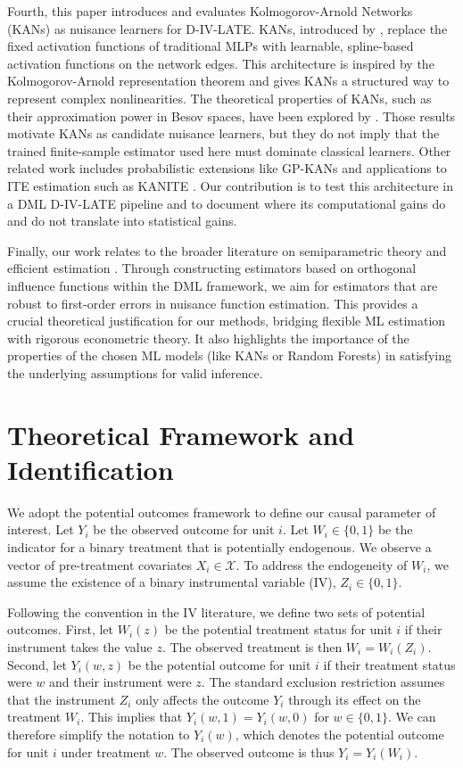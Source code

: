 \documentclass[final,3p,fleqn, 10pt]{elsarticle}
\begin{document}
Fourth, this paper introduces and evaluates Kolmogorov-Arnold Networks (KANs) as nuisance learners for D-IV-LATE. KANs, introduced by \citet{liu2024kan}, replace the fixed activation functions of traditional MLPs with learnable, spline-based activation functions on the network edges. This architecture is inspired by the Kolmogorov-Arnold representation theorem and gives KANs a structured way to represent complex nonlinearities. The theoretical properties of KANs, such as their approximation power in Besov spaces, have been explored by \citet{kratsios2025kolmogorov}. Those results motivate KANs as candidate nuisance learners, but they do not imply that the trained finite-sample estimator used here must dominate classical learners. Other related work includes probabilistic extensions like GP-KANs \citep{chen2025gpkan} and applications to ITE estimation such as KANITE \citep{mehendale2025kanite}. Our contribution is to test this architecture in a DML D-IV-LATE pipeline and to document where its computational gains do and do not translate into statistical gains.

Finally, our work relates to the broader literature on semiparametric theory and efficient estimation \citep{bickel1993efficient, newey1994asymptotic}. Through constructing estimators based on orthogonal influence functions within the DML framework, we aim for estimators that are robust to first-order errors in nuisance function estimation. This provides a crucial theoretical justification for our methods, bridging flexible ML estimation with rigorous econometric theory. It also highlights the importance of the properties of the chosen ML models (like KANs or Random Forests) in satisfying the underlying assumptions for valid inference.

\section{Theoretical Framework and Identification}
\label{sec:framework}

We adopt the potential outcomes framework to define our causal parameter of interest. Let $Y_i$ be the observed outcome for unit $i$. Let $W_i \in \{0, 1\}$ be the indicator for a binary treatment that is potentially endogenous. We observe a vector of pre-treatment covariates $X_i \in \mathcal{X}$. To address the endogeneity of $W_i$, we assume the existence of a binary instrumental variable (IV), $Z_i \in \{0, 1\}$.

Following the convention in the IV literature, we define two sets of potential outcomes. First, let $W_i(z)$ be the potential treatment status for unit $i$ if their instrument takes the value $z$. The observed treatment is then $W_i = W_i(Z_i)$. Second, let $Y_i(w, z)$ be the potential outcome for unit $i$ if their treatment status were $w$ and their instrument were $z$. The standard exclusion restriction assumes that the instrument $Z_i$ only affects the outcome $Y_i$ through its effect on the treatment $W_i$. This implies that $Y_i(w, 1) = Y_i(w, 0)$ for $w \in \{0, 1\}$. We can therefore simplify the notation to $Y_i(w)$, which denotes the potential outcome for unit $i$ under treatment $w$. The observed outcome is thus $Y_i = Y_i(W_i)$.
\end{document}
